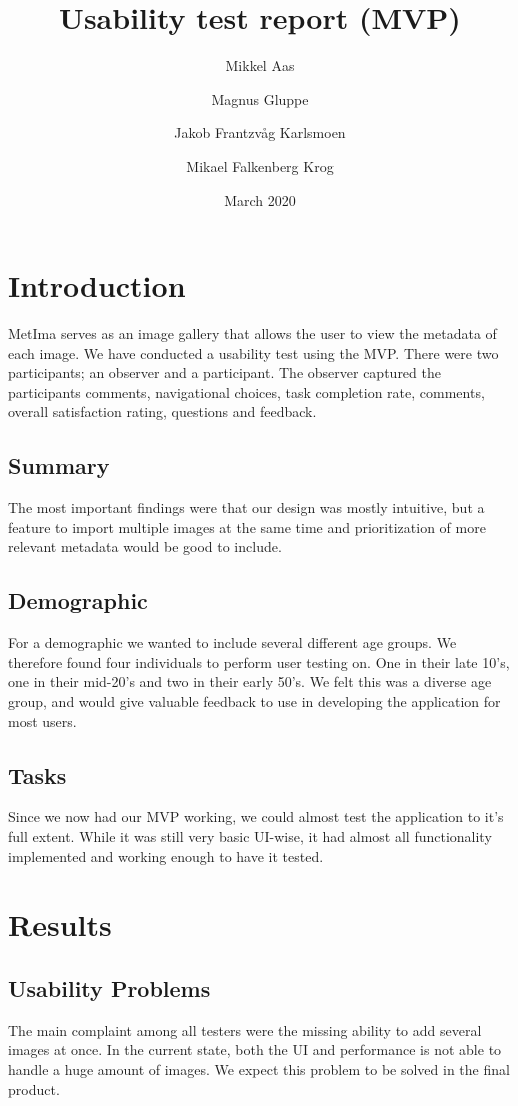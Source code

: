 \documentclass{article}
\title{Usability test report (MVP)}
\author{Mikkel Aas \and Magnus Gluppe \and Jakob Frantzvåg Karlsmoen \and Mikael Falkenberg Krog}
\date{March 2020}
\begin{document}
\maketitle

\section{Introduction}
MetIma serves as an image gallery that allows the user to view the metadata of each image. We have conducted a usability test using the MVP. There were two participants; an observer and a participant. The observer captured the participants comments, navigational choices, task completion rate, comments, overall satisfaction rating, questions and feedback.

\subsection{Summary}
The most important findings were that our design was mostly intuitive, but a feature to import multiple images at the same time and prioritization of more relevant metadata would be good to include.


\subsection{Demographic}
For a demographic we wanted to include several different age groups. We therefore found four individuals to perform user testing on. One in their late 10's, one in their mid-20's and two in their early 50's. We felt this was a diverse age group, and would give valuable feedback to use in developing the application for most users.

\subsection{Tasks}
Since we now had our MVP working, we could almost test the application to it's full extent. While it was still very basic UI-wise, it had almost all functionality implemented and working enough to have it tested.
\section{Results}

\subsection{Usability Problems}
The main complaint among all testers were the missing ability to add several images at once. In the current state, both the UI and performance is not able to handle a huge amount of images. We expect this problem to be solved in the final product.
\end{document}
